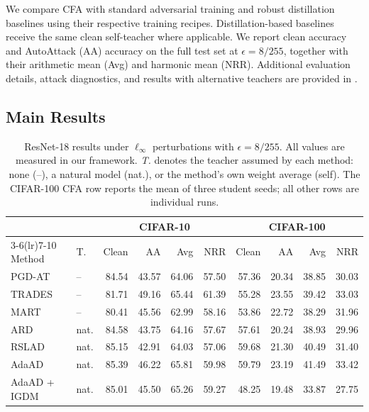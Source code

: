 \documentclass{article} %
\theoremstyle{plain}
\begin{document}
We compare CFA with standard adversarial training and robust distillation
baselines using their respective training recipes. Distillation-based
baselines receive the same clean self-teacher where applicable.
We report clean accuracy and AutoAttack (AA) accuracy on the full test set at
\(\epsilon=8/255\), together with their arithmetic mean (Avg) and harmonic
mean (NRR). Additional evaluation details, attack diagnostics, and results
with alternative teachers are provided in
.


\subsection{Main Results}

\begin{table}[!htbp]
  \centering
  \footnotesize
  \setlength{\tabcolsep}{3.2pt}
  \caption{
  ResNet-18 results under \(\ell_\infty\) perturbations with
  \(\epsilon=8/255\). All values are measured in our framework.
  \emph{T.} denotes the teacher assumed by each method: none (--),
  a natural model (nat.), or the method's own weight average (self).
  The CIFAR-100 CFA row reports the mean of three student seeds;
  all other rows are individual runs.
  }
  \label{tab:main}
  \begin{tabular}{llrrrrrrrr}
    \toprule
    & & \multicolumn{4}{c}{CIFAR-10}
      & \multicolumn{4}{c}{CIFAR-100} \\
    \cmidrule(lr){3-6}\cmidrule(lr){7-10}
    Method & T. & Clean & AA & Avg & NRR
           & Clean & AA & Avg & NRR \\
    \midrule
    PGD-AT & -- & 84.54 & 43.57 & 64.06 & 57.50
                 & 57.36 & 20.34 & 38.85 & 30.03 \\
    TRADES & -- & 81.71 & 49.16 & 65.44 & 61.39
                 & 55.28 & 23.55 & 39.42 & 33.03 \\
    MART   & -- & 80.41 & 45.56 & 62.99 & 58.16
                 & 53.86 & 22.72 & 38.29 & 31.96 \\
    \midrule
    ARD & nat. & 84.58 & 43.75 & 64.16 & 57.67
               & 57.61 & 20.24 & 38.93 & 29.96 \\
    RSLAD & nat. & 85.15 & 42.91 & 64.03 & 57.06
                 & 59.68 & 21.30 & 40.49 & 31.40 \\
    AdaAD & nat. & 85.39 & 46.22 & 65.81 & 59.98
                 & 59.79 & 23.19 & 41.49 & 33.42 \\
    AdaAD + IGDM & nat. & 85.01 & 45.50 & 65.26 & 59.27
                        & 48.25 & 19.48 & 33.87 & 27.75 \\

\end{tabular}
\end{table}
\end{document}
